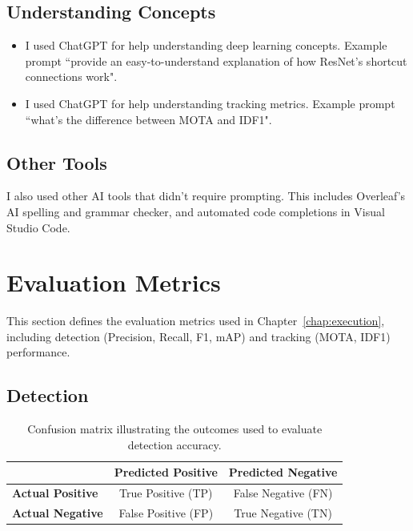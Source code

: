 \documentclass[author={Jacob Stephenson},
    degree={BSc},
    title={Robust Great Ape Species Detection in Wild Camera Trap Imagery with Promptable Concept Segmentation},
    unit={COMS30045},
    subtitle={}]{dissertation}
\begin{document}
\section{Understanding Concepts}

\begin{itemize}
    \item I used ChatGPT for help understanding deep learning concepts. Example prompt ``provide an easy-to-understand explanation of how ResNet's shortcut connections work".
    \item I used ChatGPT for help understanding tracking metrics. Example prompt ``what's the difference between MOTA and IDF1".
\end{itemize}


\section{Other Tools}

I also used other AI tools that didn't require prompting. This includes Overleaf's AI spelling and grammar checker, and automated code completions in Visual Studio Code.



\chapter{Evaluation Metrics}
\label{appx:metrics}

This section defines the evaluation metrics used in Chapter~\ref{chap:execution}, including detection (Precision, Recall, F1, mAP) and tracking (MOTA, IDF1) performance.

\section{Detection}

\begin{table}[h]
    \centering
    
    \begin{tabular}{lcc}
        \toprule
         & \textbf{Predicted Positive} & \textbf{Predicted Negative} \\
        \midrule
        \textbf{Actual Positive} & True Positive (TP) & False Negative (FN) \\
        \textbf{Actual Negative} & False Positive (FP) & True Negative (TN) \\
        \bottomrule
    \end{tabular}
    
    \caption[Model outcomes used to evaluate detection accuracy]{Confusion matrix illustrating the outcomes used to evaluate detection accuracy.}
    \label{tab:outcomecmatrix}
\end{table}
\end{document}

